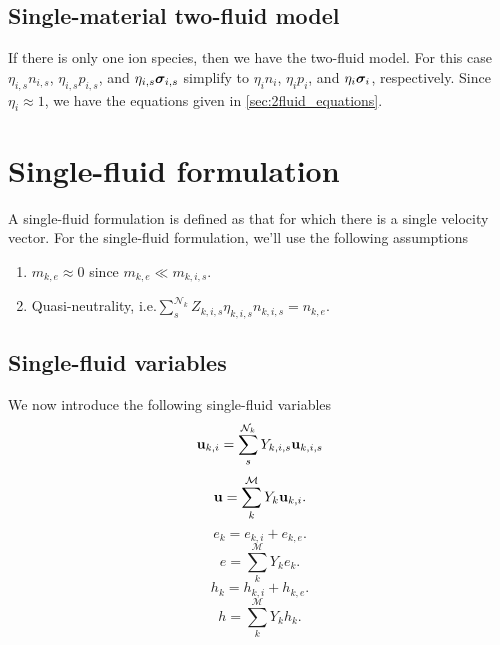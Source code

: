 \documentclass[a4paper,11pt]{report}
\begin{document}
\subsection{Single-material two-fluid model}
If there is only one ion species, then we have the two-fluid model. For this case $\eta_{i,s} n_{i,s}$, $\eta_{i,s} p_{i,s}$, and $\eta_{i,s} \bm \sigma_{i,s}$ simplify to $\eta_i n_i$, $\eta_i p_i$, and $\eta_i \bm \sigma_i$, respectively. Since $\eta_i \approx 1$, we have the equations given in \cref{sec:2fluid_equations}.

\section{Single-fluid formulation}
A single-fluid formulation is defined as that for which there is a single velocity vector. For the single-fluid formulation, we'll use the following assumptions
\begin{enumerate}
    \item $m_{k,e} \approx 0$ since $m_{k,e} \ll m_{k,i,s}$. \label{eq:sf_no_e_mass} 
    \item Quasi-neutrality, i.e.\@ $\sum_s^{\mathcal{N}_k} Z_{k,i,s} \eta_{k,i,s} n_{k,i,s} = n_{k,e}$. \label{eq:sf_quasi_neutrality}
\end{enumerate}

\subsection{Single-fluid variables}
\label{sec:sf_vars}
We now introduce the following single-fluid variables
\begin{equation}
    \label{eq:sf_vars_u_ki}
    \mathbf{u}_{k,i} = \sum_s^{\mathcal{N}_k} Y_{k,i,s} \mathbf{u}_{k,i,s} 
\end{equation}
\begin{equation}
    \label{eq:sf_vars_u}
    \mathbf{u} = \sum_k^\mathcal{M} Y_k \mathbf{u}_{k,i}.
\end{equation}
\begin{equation}
    \label{eq:sf_vars_e_k}
    e_k = e_{k,i} + e_{k,e}.
\end{equation}
\begin{equation}
    \label{eq:sf_vars_e}
    e = \sum_k^\mathcal{M} Y_k e_k.
\end{equation}
\begin{equation}
    h_k = h_{k,i} + h_{k,e}.
\end{equation}
\begin{equation}
    h = \sum_k^\mathcal{M} Y_k h_k.
\end{equation}
\end{document}

